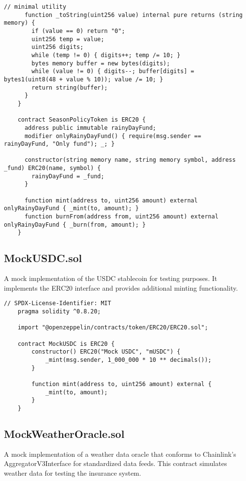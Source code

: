 \begin{lstlisting}[style=soliditystyle, caption={RainyDayFund.sol - Main Insurance Contract},label={lst:lstlistingA}]
      // minimal utility
      function _toString(uint256 value) internal pure returns (string memory) {
        if (value == 0) return "0";
        uint256 temp = value;
        uint256 digits;
        while (temp != 0) { digits++; temp /= 10; }
        bytes memory buffer = new bytes(digits);
        while (value != 0) { digits--; buffer[digits] = bytes1(uint8(48 + value % 10)); value /= 10; }
        return string(buffer);
      }
    }

    contract SeasonPolicyToken is ERC20 {
      address public immutable rainyDayFund;
      modifier onlyRainyDayFund() { require(msg.sender == rainyDayFund, "Only fund"); _; }

      constructor(string memory name, string memory symbol, address _fund) ERC20(name, symbol) {
        rainyDayFund = _fund;
      }

      function mint(address to, uint256 amount) external onlyRainyDayFund { _mint(to, amount); }
      function burnFrom(address from, uint256 amount) external onlyRainyDayFund { _burn(from, amount); }
    }
    \end{lstlisting}


	\subsection{MockUSDC.sol}\label{subsec:mock-usdc}
	A mock implementation of the USDC stablecoin for testing purposes.
    It implements the ERC20 interface and provides additional minting functionality.

	\begin{lstlisting}[style=soliditystyle, caption={MockUSDC.sol - Mock Stablecoin for Testing},label={lst:lstlisting2}]
    // SPDX-License-Identifier: MIT
    pragma solidity ^0.8.20;

    import "@openzeppelin/contracts/token/ERC20/ERC20.sol";

    contract MockUSDC is ERC20 {
        constructor() ERC20("Mock USDC", "mUSDC") {
            _mint(msg.sender, 1_000_000 * 10 ** decimals());
        }

        function mint(address to, uint256 amount) external {
            _mint(to, amount);
        }
    }
    \end{lstlisting}

	\subsection{MockWeatherOracle.sol}\label{subsec:mock-weather-oracle}
	A mock implementation of a weather data oracle that conforms to Chainlink's AggregatorV3Interface for standardized data feeds. This contract simulates weather data for testing the insurance system.

